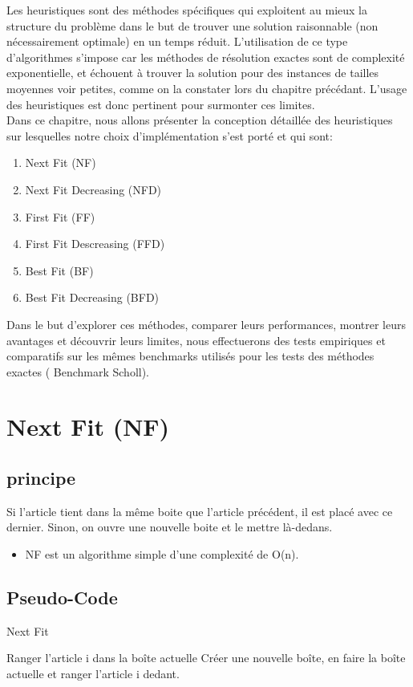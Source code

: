 \documentclass[class=article, crop=false]{standalone}
\begin{document}
Les heuristiques sont des méthodes spécifiques qui exploitent au mieux la structure du 
problème dans le but de trouver une solution raisonnable (non nécessairement optimale) en un temps réduit. 
L’utilisation de ce type d’algorithmes s'impose car les méthodes de résolution exactes sont 
de complexité exponentielle, et échouent à trouver la solution pour des instances de tailles moyennes voir petites,
 comme on la constater lors du chapitre précédant. 
L'usage des heuristiques est donc pertinent pour surmonter ces limites.\\

Dans ce chapitre, nous allons présenter la conception détaillée des heuristiques sur lesquelles notre choix d’implémentation s’est porté et qui sont:
\begin{enumerate}
    \item Next Fit (NF)
    \item Next Fit Decreasing (NFD)
    \item First Fit (FF)
    \item First Fit Descreasing (FFD)
    \item Best Fit (BF)
    \item Best Fit Decreasing (BFD)\\
\end{enumerate}

Dans le but d’explorer ces méthodes, comparer leurs performances, montrer leurs avantages et découvrir leurs limites, nous effectuerons des tests empiriques et comparatifs sur les mêmes  benchmarks utilisés pour les tests des méthodes exactes ( Benchmark Scholl).
\newpage
\section{Next Fit (NF)}
\subsection{principe}
Si l’article tient dans la même boite que l’article précédent, il est placé avec ce dernier. Sinon, on ouvre une nouvelle boite et le mettre là-dedans.
\begin{itemize}
    \item NF est un algorithme simple d’une complexité de O(n). 
\end{itemize}

\subsection{Pseudo-Code}
\begin{algorithm}[H]
    \caption{Next Fit}
    \begin{algorithmic}
            \STATE Ranger l’article i dans la boîte actuelle
        \ELSE 
            \STATE Créer une nouvelle boîte, en faire la boîte actuelle et ranger l'article i dedant.
        \ENDIF
    \ENDFOR
    \end{algorithmic}
\end{algorithm}
\end{document}
